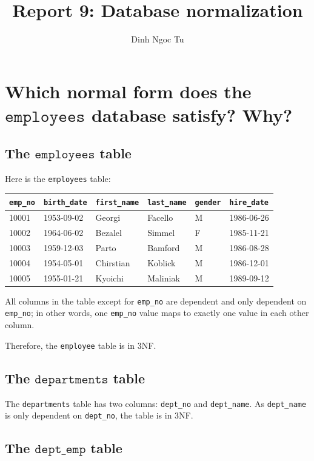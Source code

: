 \documentclass[12pt]{article}
\title{Report 9: Database normalization}
\author{Dinh Ngoc Tu}
\begin{document}
\maketitle


\section{Which normal form does the $\texttt{employees}$ database satisfy? Why?}

\subsection{The $\texttt{employees}$ table}

Here is the \verb|employees| table:

\begin{tabular}{l|l|l|l|l|l}
	\verb|emp_no| & \verb|birth_date| & \verb|first_name| & \verb|last_name| & \verb|gender| & \verb|hire_date| \\
	\hline
	10001 & 1953-09-02 & Georgi & Facello & M & 1986-06-26 \\
	10002 & 1964-06-02 & Bezalel & Simmel & F & 1985-11-21 \\
	10003 & 1959-12-03 & Parto & Bamford & M & 1986-08-28 \\
	10004 & 1954-05-01 & Chirstian & Koblick & M & 1986-12-01 \\
	10005 & 1955-01-21 & Kyoichi & Maliniak & M & 1989-09-12 \\
\end{tabular}

All columns in the table except for \verb|emp_no| are dependent and only dependent on \verb|emp_no|; in other words, one \verb|emp_no| value maps to exactly one value in each other column.

Therefore, the \verb|employee| table is in 3NF.

\subsection{The $\texttt{departments}$ table}

The \verb|departments| table has two columns: \verb|dept_no| and \verb|dept_name|. As \verb|dept_name| is only dependent on \verb|dept_no|, the table is in 3NF.

\subsection{The $\texttt{dept\_emp}$ table}
\end{document}
